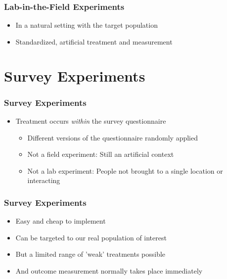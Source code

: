 \documentclass[xcolor=x11names,compress]{beamer}\usepackage[]{graphicx}\usepackage[]{color}
\renewcommand{\(}{\begin{columns}}
\renewcommand{\)}{\end{columns}}
\newcommand{\<}[1]{\begin{column}{#1}}
\renewcommand{\>}{\end{column}}
\begin{document}
\begin{frame}
\frametitle{Lab-in-the-Field Experiments}
\begin{itemize}
\item In a natural setting with the target population
\pause
\item Standardized, artificial treatment and measurement
\end{itemize}
\end{frame}

\section{Survey Experiments}

\begin{frame}
\frametitle{Survey Experiments}
\begin{itemize}
\item Treatment occurs \textit{within} the survey questionnaire
\pause
\begin{itemize}
\item Different versions of the questionnaire randomly applied
\pause
\item Not a field experiment: Still an artificial context
\pause
\item Not a lab experiment: People not brought to a single location or interacting
\end{itemize}
\end{itemize}
\end{frame}

\begin{frame}
\frametitle{Survey Experiments}
\begin{itemize}
\item Easy and cheap to implement
\pause
\item Can be targeted to our real population of interest
\pause
\item But a limited range of 'weak' treatments possible
\pause
\item And outcome measurement normally takes place immediately
\end{itemize}
\end{frame}
\end{document}
